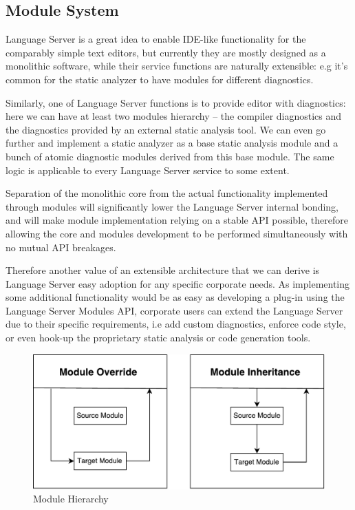 \subsection{Module System}
\label{sec:met:arch:ms}

Language Server is a great idea to enable IDE-like functionality for
the comparably simple text editors, but currently they are mostly designed as 
a monolithic software, while their service functions are naturally extensible: 
e.g it's common for the static analyzer to have modules for different diagnostics.

Similarly, one of Language Server functions is to provide editor with diagnostics: here we can 
have at least two modules hierarchy -- the compiler diagnostics and the diagnostics provided by an external static analysis tool.
We can even go further and implement a static analyzer as a base static analysis module and a bunch of atomic diagnostic modules derived 
from this base module. 
The same logic is applicable to every Language Server service to some extent.

Separation of the monolithic core from the actual functionality implemented through modules
will significantly lower the Language Server internal bonding, and will make
module implementation relying on a stable API possible, therefore allowing the core and modules
development to be performed simultaneously with no mutual API breakages.

Therefore another value of an extensible architecture that we can derive is 
Language Server easy adoption for any specific corporate needs. 
As implementing some additional functionality would be as easy as developing a plug-in using 
the Language Server Modules API, corporate users can extend the Language Server 
due to their specific requirements, i.e add custom diagnostics, enforce code style, 
or even hook-up the proprietary static analysis or code generation tools.

\begin{figure}[H]
    \centering
    \includegraphics[width=.7\textwidth]{figs/module_hierarchy.pdf}
    \caption{Module Hierarchy}
\end{figure}

